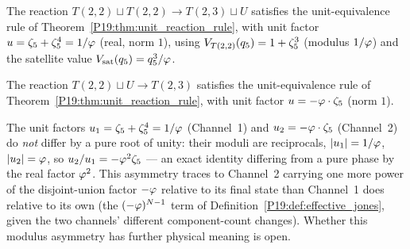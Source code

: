 \begin{theorem}
\label{P19:thm:channel_1}
The reaction $T(2,2)\sqcup T(2,2)\to T(2,3)\sqcup U$ satisfies the
unit-equivalence rule of Theorem~\ref{P19:thm:unit_reaction_rule},
with unit factor $u=\zeta_5+\zeta_5^4=1/\varphi$ (real, norm $1$), using
$V_{T(2,2)}(q_5)=1+\zeta_5^3$ (modulus $1/\varphi$) and the
satellite value $V_{\mathrm{sat}}(q_5)=q_5^3/\varphi$.
\end{theorem}

\begin{theorem}
\label{P19:thm:channel_2}
The reaction $T(2,2)\sqcup U\to T(2,3)$ satisfies the unit-equivalence
rule of Theorem~\ref{P19:thm:unit_reaction_rule}, with unit factor
$u=-\varphi\cdot\zeta_5$ (norm $1$).
\end{theorem}

\begin{remark}
\label{P19:rem:unit_meaning}
The unit factors $u_1=\zeta_5+\zeta_5^4=1/\varphi$ (Channel~1) and
$u_2=-\varphi\cdot\zeta_5$ (Channel~2) do \emph{not} differ by a pure
root of unity: their moduli are reciprocals, $|u_1|=1/\varphi$,
$|u_2|=\varphi$, so $u_2/u_1=-\varphi^2\zeta_5$ --- an exact identity
differing from a pure phase by the real factor $\varphi^2$. This
asymmetry traces to Channel~2 carrying one more power of the
disjoint-union factor $-\varphi$ relative to its final state than
Channel~1 does relative to its own (the $(-\varphi)^{N-1}$ term of
Definition~\ref{P19:def:effective_jones}, given the two channels'
different component-count changes). Whether this modulus asymmetry
has further physical meaning is open.
\end{remark}


